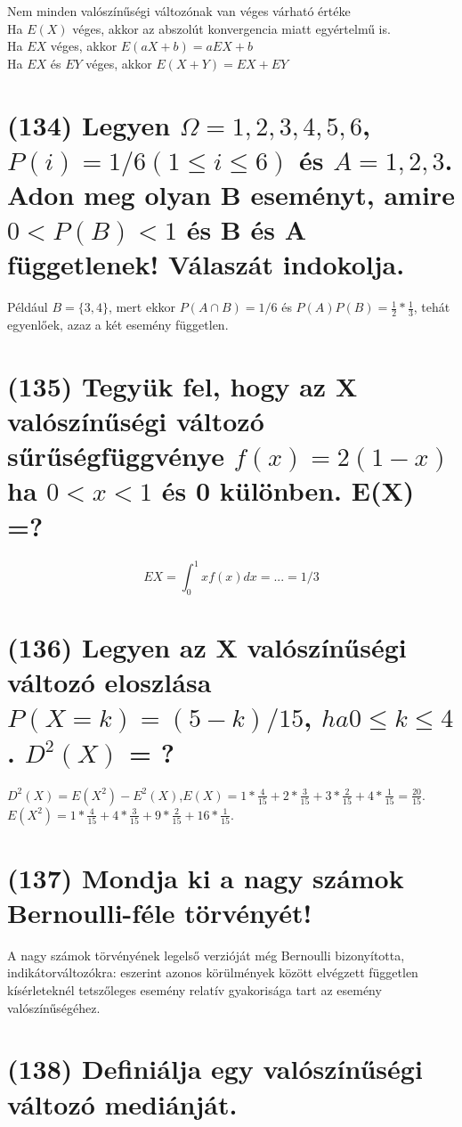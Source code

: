 \documentclass[12p]{article}
\begin{document}
Nem minden valószínűségi változónak van véges várható értéke\\
Ha $E(X)$ véges, akkor az abszolút konvergencia miatt egyértelmű is.\\
Ha $EX$ véges, akkor $E(aX+b)=aEX+b$\\
Ha $EX$ és $EY$ véges, akkor $E(X+Y)=EX+EY$

\section{(134) Legyen $\Omega = {1, 2, 3, 4, 5, 6}$, $P(i) = 1/6 (1 \leq i \leq 6)$ és $A = {1, 2, 3}$. Adon meg olyan B
eseményt, amire $0 < P(B) < 1$ és B és A függetlenek! Válaszát indokolja.}

 Például $B = \{3, 4\}$, mert ekkor $P(A \cap B) = 1/6$ és $P(A)P(B) = \frac{1}{2} * \frac{1}{3}$, tehát egyenlőek, azaz a két esemény független.

\section{(135) Tegyük fel, hogy az X valószínűségi változó sűrűségfüggvénye $f(x) = 2(1-x)$ ha $0 < x < 1$ és 0 különben. E(X) =? }

$$EX = \int^1_0 xf(x)dx = ... = 1/3$$

\section{(136) Legyen az X valószínűségi változó eloszlása $P(X = k) = (5 - k)/15$, $ha 0 \leq k \leq 4$. $D^2(X)$ = ?}

$D^2(X) = E(X^2) - E^2(X)$,$E(X) = 1 * \frac{4}{15} + 2 * \frac{3}{15} + 3 * \frac{2}{15} + 4 * \frac{1}{15} = \frac{20}{15}$.\\
$E(X^2) = 1 * \frac{4}{15} + 4 * \frac{3}{15} + 9 * \frac{2}{15} + 16 * \frac{1}{15}$.

\section{(137) Mondja ki a nagy számok Bernoulli-féle törvényét!}

A nagy számok törvényének legelső verzióját
még Bernoulli bizonyította,
indikátorváltozókra: eszerint azonos
körülmények között elvégzett független
kísérleteknél tetszőleges esemény relatív
gyakorisága tart az esemény
valószínűségéhez.

\section{(138) Definiálja egy valószínűségi változó mediánját.}
\end{document}
